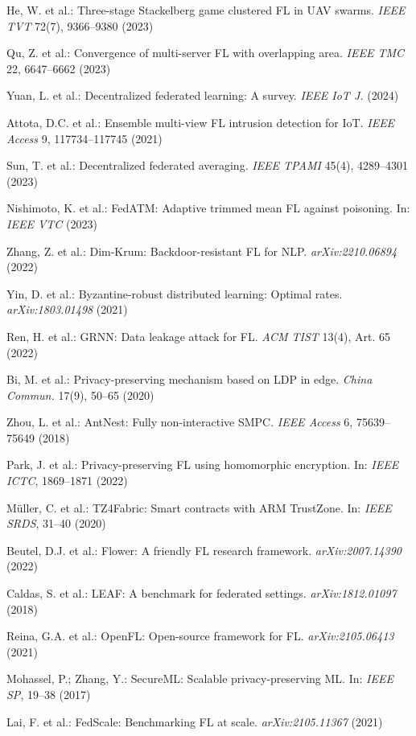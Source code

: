 \documentclass[a4paper]{article}
\begin{document}
\begin{enumerate}[leftmargin=0.8cm, itemsep=0pt, parsep=0pt, label={[\arabic*]}]
\item He, W. et al.: Three-stage Stackelberg game clustered FL in UAV swarms. \textit{IEEE TVT} 72(7), 9366--9380 (2023)
\item Qu, Z. et al.: Convergence of multi-server FL with overlapping area. \textit{IEEE TMC} 22, 6647--6662 (2023)
\item Yuan, L. et al.: Decentralized federated learning: A survey. \textit{IEEE IoT J.} (2024)
\item Attota, D.C. et al.: Ensemble multi-view FL intrusion detection for IoT. \textit{IEEE Access} 9, 117734--117745 (2021)
\item Sun, T. et al.: Decentralized federated averaging. \textit{IEEE TPAMI} 45(4), 4289--4301 (2023)
\item Nishimoto, K. et al.: FedATM: Adaptive trimmed mean FL against poisoning. In: \textit{IEEE VTC} (2023)
\item Zhang, Z. et al.: Dim-Krum: Backdoor-resistant FL for NLP. \textit{arXiv:2210.06894} (2022)
\item Yin, D. et al.: Byzantine-robust distributed learning: Optimal rates. \textit{arXiv:1803.01498} (2021)
\item Ren, H. et al.: GRNN: Data leakage attack for FL. \textit{ACM TIST} 13(4), Art. 65 (2022)
\item Bi, M. et al.: Privacy-preserving mechanism based on LDP in edge. \textit{China Commun.} 17(9), 50--65 (2020)
\item Zhou, L. et al.: AntNest: Fully non-interactive SMPC. \textit{IEEE Access} 6, 75639--75649 (2018)
\item Park, J. et al.: Privacy-preserving FL using homomorphic encryption. In: \textit{IEEE ICTC}, 1869--1871 (2022)
\item M\"uller, C. et al.: TZ4Fabric: Smart contracts with ARM TrustZone. In: \textit{IEEE SRDS}, 31--40 (2020)
\item Beutel, D.J. et al.: Flower: A friendly FL research framework. \textit{arXiv:2007.14390} (2022)
\item Caldas, S. et al.: LEAF: A benchmark for federated settings. \textit{arXiv:1812.01097} (2018)
\item Reina, G.A. et al.: OpenFL: Open-source framework for FL. \textit{arXiv:2105.06413} (2021)
\item Mohassel, P.; Zhang, Y.: SecureML: Scalable privacy-preserving ML. In: \textit{IEEE SP}, 19--38 (2017)
\item Lai, F. et al.: FedScale: Benchmarking FL at scale. \textit{arXiv:2105.11367} (2021)

\end{enumerate}
\end{document}
